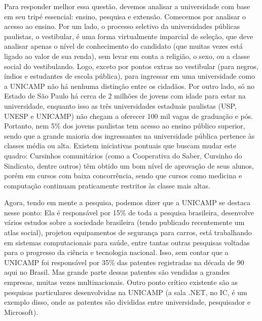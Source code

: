 \documentclass[a4paper,10pt]{article}
\begin{document}
Para responder melhor essa questão, devemos analisar a universidade com base em
seu tripé essencial: ensino, pesquisa e extensão. Comecemos por analisar
o acesso ao ensino. Por um lado, o processo seletivo da universidades públicas
paulistas, o vestibular, é uma forma virtualmente imparcial de seleção, que deve
analisar apenas o nível de conhecimento do candidato (que muitas vezes está
ligado ao valor de sua renda), sem levar em conta a religião, o sexo, ou
a classe social do vestibulando. Logo, exceto por pontos extras no vestibular
(para negros, índios e estudantes de escola pública), para ingressar em uma
universidade como a UNICAMP não há nenhuma distinção entre os cidadãos. Por
outro lado, só no Estado de São Paulo há cerca de 2 milhões de jovens com idade
para estar na universidade, enquanto isso as três universidades estaduais
paulistas (USP, UNESP e UNICAMP) não chegam a oferecer 100 mil vagas de
graduação e pós. Portanto, nem 5\% dos jovens paulistas tem acesso ao ensino
público superior, sendo que a grande maioria dos ingressantes na universidade
pública pertence às classes média ou alta. Existem iniciativas pontuais que
buscam mudar este quadro: Cursinhos comunitários (como a Cooperativa do Saber,
Cursinho do Sindicato, dentre outros) têm obtido um bom nível de aprovação de
seus alunos, porém em cursos com baixa concorrência, sendo que cursos como
medicina e computação continuam praticamente restritos às classe mais altas.

Agora, tendo em mente a pesquisa, podemos dizer que a UNICAMP se destaca nesse
ponto: Ela é responsável por 15\% de toda a pesquisa brasileira, desenvolve
vários estudos sobre a sociedade brasileira (tendo publicado recentemente um
atlas social), projetou equipamentos de segurança para carros, está trabalhando
em sistemas computacionais para saúde, entre tantas outras pesquisas voltadas
para o progresso da ciência e tecnologia nacional. Isso, sem contar que
a UNICAMP foi responsável por 35\% das patentes registradas na década de 90 aqui
no Brasil. Mas grande parte dessas patentes são vendidas a grandes empresas,
muitas vezes multinacionais. Outro ponto crítico existente são as pesquisas
particulares desenvolvidas na UNICAMP (a sala .NET, no IC, é um exemplo disso,
onde as patentes são divididas entre universidade, pesquisador e Microsoft).
\end{document}
